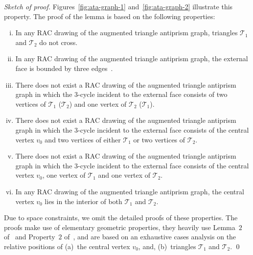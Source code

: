 \documentclass{llncs}
\newenvironment{sketchofproof}{\noindent\textit{Sketch of
proof.}}{\mbox{}\hfill\qed\par\medskip}
\begin{document}
\begin{sketchofproof}
Figures~\ref{fig:ata-graph-1} and~\ref{fig:ata-graph-2} illustrate
this property. The proof of the lemma is based on the following
properties:

\begin{enumerate}[i)]
\item In any RAC drawing of the augmented triangle antiprism graph,
triangles $\mathcal{T}_1$ and $\mathcal{T}_2$ do not cross.

\item In any RAC drawing of the augmented triangle antiprism graph,
the external face is bounded by three edges~\cite{EL11}.

\item There does not exist a RAC drawing of the augmented triangle
antiprism graph in which the $3$-cycle incident to the external face
consists of two vertices of $\mathcal{T}_1$ ($\mathcal{T}_2$) and
one vertex of $\mathcal{T}_2$ ($\mathcal{T}_1$).

\item There does not exist a RAC drawing of the augmented triangle
antiprism graph in which the $3$-cycle incident to the external face
consists of the central vertex $v_0$ and two vertices of either
$\mathcal{T}_1$ or two vertices of $\mathcal{T}_2$.

\item There does not exist a RAC drawing of the augmented triangle
antiprism graph in which the $3$-cycle incident to the external face
consists of the central vertex $v_0$, one vertex of $\mathcal{T}_1$
and one vertex of $\mathcal{T}_2$.

\item In any RAC drawing of the augmented triangle antiprism
graph, the central vertex $v_0$ lies in the interior of both
$\mathcal{T}_1$ and $\mathcal{T}_2$.
\end{enumerate}

Due to space constraints, we omit the detailed proofs of these
properties. The proofs make use of elementary geometric properties,
they heavily use Lemma~$2$ of~\cite{DEL09} and Property~$2$
of~\cite{ACBDFKS09}, and are based on an exhaustive cases analysis
on the relative positions of (a)~the central vertex $v_0$, and,
(b)~triangles $\mathcal{T}_1$ and $\mathcal{T}_2$.
\end{sketchofproof}
\end{document}
